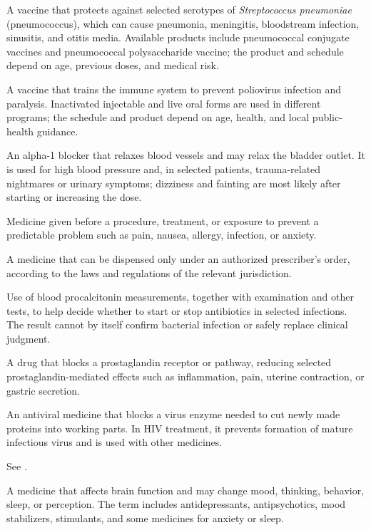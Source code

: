  A vaccine that protects against selected serotypes of \textit{Streptococcus pneumoniae} (pneumococcus), which can cause pneumonia, meningitis, bloodstream infection, sinusitis, and otitis media. Available products include pneumococcal conjugate vaccines and pneumococcal polysaccharide vaccine; the product and schedule depend on age, previous doses, and medical risk.

 A vaccine that trains the immune system to prevent poliovirus infection and paralysis. Inactivated injectable and live oral forms are used in different programs; the schedule and product depend on age, health, and local public-health guidance.

 An alpha-1 blocker that relaxes blood vessels and may relax the bladder outlet. It is used for high blood pressure and, in selected patients, trauma-related nightmares or urinary symptoms; dizziness and fainting are most likely after starting or increasing the dose.

 Medicine given before a procedure, treatment, or exposure to prevent a predictable problem such as pain, nausea, allergy, infection, or anxiety.


 A medicine that can be dispensed only under an authorized prescriber’s order, according to the laws and regulations of the relevant jurisdiction.

 Use of blood procalcitonin measurements, together with examination and other tests, to help decide whether to start or stop antibiotics in selected infections. The result cannot by itself confirm bacterial infection or safely replace clinical judgment.

 A drug that blocks a prostaglandin receptor or pathway, reducing selected prostaglandin-mediated effects such as inflammation, pain, uterine contraction, or gastric secretion.

 An antiviral medicine that blocks a virus enzyme needed to cut newly made proteins into working parts. In HIV treatment, it prevents formation of mature infectious virus and is used with other medicines.

 See .

 A medicine that affects brain function and may change mood, thinking, behavior, sleep, or perception. The term includes antidepressants, antipsychotics, mood stabilizers, stimulants, and some medicines for anxiety or sleep.

